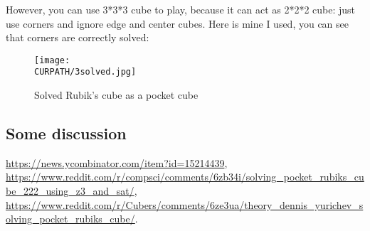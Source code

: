 However, you can use 3*3*3 cube to play, because it can act as 2*2*2 cube: just use corners and ignore
edge and center cubes.
Here is mine I used, you can see that corners are correctly solved:

\begin{figure}[H]
\centering
\texttt{[image: \\CURPATH/3solved.jpg]}
\caption{Solved Rubik's cube as a pocket cube}
\end{figure}

\subsection{Some discussion}

\url{https://news.ycombinator.com/item?id=15214439},\\
\url{https://www.reddit.com/r/compsci/comments/6zb34i/solving_pocket_rubiks_cube_222_using_z3_and_sat/},\\
\url{https://www.reddit.com/r/Cubers/comments/6ze3ua/theory_dennis_yurichev_solving_pocket_rubiks_cube/}.

